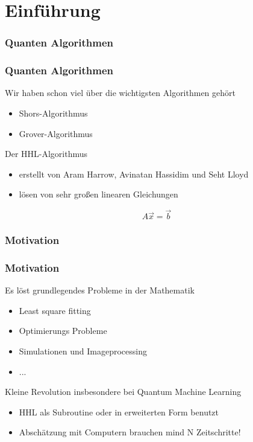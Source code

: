 \section{Einführung}

\subsubsection{Quanten Algorithmen}

    \begin{frame}
        \frametitle{Quanten Algorithmen}

        Wir haben schon viel über die wichtigsten Algorithmen gehört
        \begin{itemize}
            \item  Shors-Algorithmus
            \item  Grover-Algorithmus
        \end{itemize}

        \hfill

        Der HHL-Algorithmus
        \begin{itemize}
            \item  erstellt von Aram Harrow, Avinatan Hassidim und Seht Lloyd 
            \item  lösen von sehr großen linearen Gleichungen 
        \end{itemize}

        $$ A \vec{x} = \vec{b} $$

    \end{frame}


\subsubsection{Motivation}

    \begin{frame}
        \frametitle{Motivation}

        Es löst grundlegendes Probleme in der Mathematik
        \begin{itemize}
            \item   Least square fitting 
            \item   Optimierungs Probleme
            \item   Simulationen und Imageprocessing
            \item   ...
       \end{itemize}

        \hfil

        Kleine Revolution insbesondere bei Quantum Machine Learning
        \begin{itemize}
            \item HHL als Subroutine oder in erweiterten Form benutzt
            \item Abschätzung mit Computern brauchen mind N Zeitschritte!
       \end{itemize}


    \end{frame}

